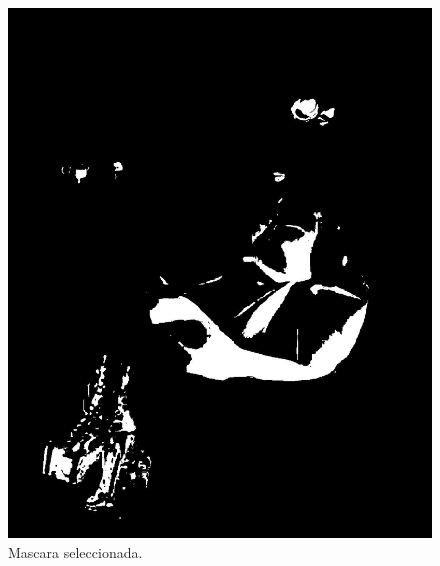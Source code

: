 \documentclass[11pt, letterpaper]{article}
\begin{document}
\begin{figure}[h!]
	\vspace{1em} %
	
	\begin{minipage}{0.4\textwidth}
		\centering
		\includegraphics[width=\textwidth]{IMG/R42.jpg}
		\caption*{Mascara seleccionada.}
	\end{minipage}\hfill
	\begin{minipage}{0.4\textwidth}
		\centering

\end{minipage}
\end{figure}
\end{document}
